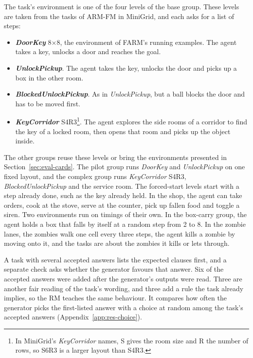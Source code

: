 \documentclass[11pt,english,listoffigures,listoftables]{tfgetsinf}
\newcommand{\env}[1]{\textsf{\slshape #1}}  %
\begin{document}
The task's environment is one of the four levels of the base group. These levels are taken from the tasks of ARM-FM in MiniGrid, and each asks for a list of steps:
\begin{itemize}
    \item \textbf{\env{DoorKey}} 8$\times$8, the environment of FARM's running examples. The agent takes a key, unlocks a door and reaches the goal.
    \item \textbf{\env{UnlockPickup}}. The agent takes the key, unlocks the door and picks up a box in the other room.
    \item \textbf{\env{BlockedUnlockPickup}}. As in \env{UnlockPickup}, but a ball blocks the door and has to be moved first.
    \item \textbf{\env{KeyCorridor}} S4R3\footnote{In MiniGrid's \env{KeyCorridor} names, S gives the room size and R the number of rows, so S6R3 is a larger layout than S4R3.}. The agent explores the side rooms of a corridor to find the key of a locked room, then opens that room and picks up the object inside.
\end{itemize}
\noindent The other groups reuse these levels or bring the environments presented in Section~\ref{sec:eval-cards}. The pilot group runs \env{DoorKey} and \env{UnlockPickup} on one fixed layout, and the complex group runs \env{KeyCorridor} S4R3, \env{BlockedUnlockPickup} and the service room. The forced-start levels start with a step already done, such as the key already held. In the shop, the agent can take orders, cook at the stove, serve at the counter, pick up fallen food and toggle a siren. Two environments run on timings of their own. In the box-carry group, the agent holds a box that falls by itself at a random step from 2 to 8. In the zombie lanes, the zombies walk one cell every three steps, the agent kills a zombie by moving onto it, and the tasks are about the zombies it kills or lets through.

A task with several accepted answers lists the expected clauses first, and a separate check asks whether the generator favours that answer. Six of the accepted answers were added after the generator's outputs were read. Three are another fair reading of the task's wording, and three add a rule the task already implies, so the RM teaches the same behaviour. It compares how often the generator picks the first-listed answer with a choice at random among the task's accepted answers (Appendix~\ref{app:res-choice}).
\end{document}
